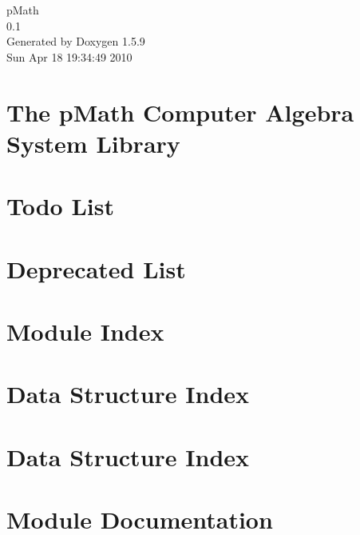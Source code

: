 \documentclass[a4paper]{article}
\begin{document}
\hypersetup{pageanchor=false}
\begin{titlepage}
\vspace*{7cm}
\begin{center}
{\Large pMath \\[1ex]\large 0.1 }\\
\vspace*{1cm}
{\large Generated by Doxygen 1.5.9}\\
\vspace*{0.5cm}
{\small Sun Apr 18 19:34:49 2010}\\
\end{center}
\end{titlepage}
\tableofcontents
{}
\hypersetup{pageanchor=true}
\section{The pMath Computer Algebra System Library}
\label{index}\hypertarget{index}{}
\section{Todo List}
\label{todo}
\hypertarget{todo}{}

\section{Deprecated List}
\label{deprecated}
\hypertarget{deprecated}{}

\section{Module Index}

\section{Data Structure Index}

\section{Data Structure Index}

\section{Module Documentation}



















\end{document}
